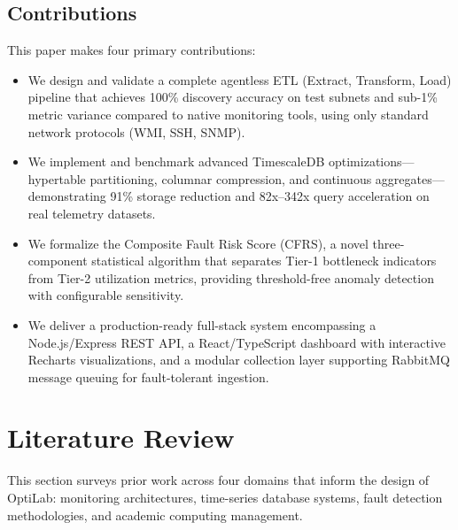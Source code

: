 \documentclass{ieeeaccess}
\begin{document}
\subsection{Contributions}
This paper makes four primary contributions:

\begin{itemize}
    \item We design and validate a complete agentless ETL (Extract, Transform, Load) pipeline that achieves 100\% discovery accuracy on test subnets and sub-1\% metric variance compared to native monitoring tools, using only standard network protocols (WMI, SSH, SNMP).
    \item We implement and benchmark advanced TimescaleDB optimizations---hypertable partitioning, columnar compression, and continuous aggregates---demonstrating 91\% storage reduction and 82x--342x query acceleration on real telemetry datasets.
    \item We formalize the Composite Fault Risk Score (CFRS), a novel three-component statistical algorithm that separates Tier-1 bottleneck indicators from Tier-2 utilization metrics, providing threshold-free anomaly detection with configurable sensitivity.
    \item We deliver a production-ready full-stack system encompassing a Node.js/Express REST API, a React/TypeScript dashboard with interactive Recharts visualizations, and a modular collection layer supporting RabbitMQ message queuing for fault-tolerant ingestion.
\end{itemize}


\section{Literature Review}
\label{sec:literature}
This section surveys prior work across four domains that inform the design of OptiLab: monitoring architectures, time-series database systems, fault detection methodologies, and academic computing management.
\end{document}
